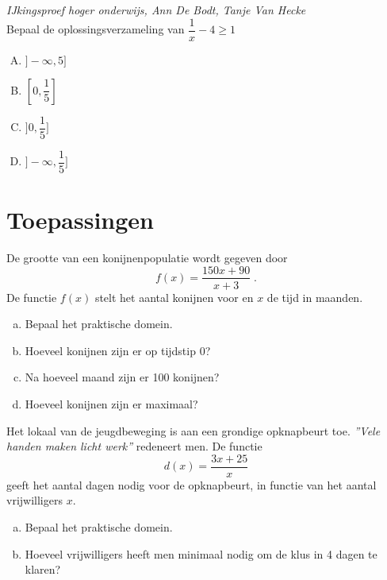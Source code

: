\documentclass[12pt,twoside,a4paper]{article}
\begin{document}
\begin{oefening}{\scriptsize\em IJkingsproef hoger onderwijs, Ann De Bodt, Tanje Van Hecke}\\
Bepaal de oplossingsverzameling van $\dfrac{1}{x} - 4 \geq 1$\\
\begin{enumerate}[(A)]
  \itemsep.5em
  \item $]-\infty, 5]$
  \item $[0, \dfrac{1}{5}]$
  \item $]0, \dfrac{1}{5}]$
  \item $]-\infty, \dfrac{1}{5}]$
\end{enumerate}
\end{oefening}

\cleardoublepage
\section{Toepassingen}

\begin{oefening}
De grootte van een konijnenpopulatie wordt gegeven door
$$f(x)=\dfrac{150x+90}{x+3}\;.$$
De functie $f(x)$ stelt het aantal konijnen voor en $x$ de tijd in maanden.
\begin{enumerate}[(a)]
  \item Bepaal het praktische domein.
  \item Hoeveel konijnen zijn er op tijdstip 0?
  \item Na hoeveel maand zijn er 100 konijnen?
  \item Hoeveel konijnen zijn er maximaal?
\end{enumerate}
\end{oefening}

\begin{oefening}
Het lokaal van de jeugdbeweging is aan een grondige opknapbeurt toe. {\em ''Vele handen maken licht werk''} redeneert men. De functie
$$d(x)=\dfrac{3x+25}{x}$$
geeft het aantal dagen nodig voor de opknapbeurt, in functie van het aantal vrijwilligers $x$.
\begin{enumerate}[(a)]
  \item Bepaal het praktische domein.
  \item Hoeveel vrijwilligers heeft men minimaal nodig om de klus in 4 dagen te klaren?
\end{enumerate}
\end{oefening}
\end{document}
